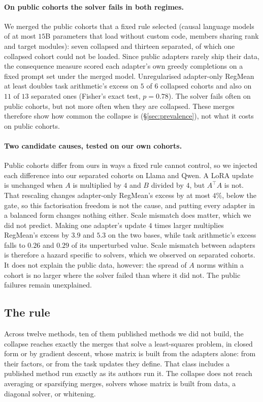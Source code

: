\paragraph{On public cohorts the solver fails in both regimes.} We merged the
public cohorts that a fixed rule selected (causal language models of at most
$15$B parameters that load without custom code, members sharing rank and
target modules): seven collapsed and thirteen separated, of which one
collapsed cohort could not be loaded. Since public adapters rarely ship their
data, the consequence measure scored each adapter's own greedy completions on
a fixed prompt set under the merged model. Unregularised adapter-only RegMean
at least doubles task arithmetic's excess on $5$ of $6$ collapsed cohorts and
also on $11$ of $13$ separated ones (Fisher's exact test, $p = 0.78$). The
solver fails often on public cohorts, but not more often when they are
collapsed. These merges therefore show how common the collapse is
(\S\ref{sec:prevalence}), not what it costs on public cohorts.

\paragraph{Two candidate causes, tested on our own cohorts.} Public cohorts
differ from ours in ways a fixed rule cannot control, so we injected each
difference into our separated cohorts on Llama and Qwen. A LoRA update is
unchanged when $A$ is multiplied by $4$ and $B$ divided by $4$, but $A^\top A$
is not. That rescaling changes adapter-only RegMean's excess by at most $4\%$,
below the gate, so this factorisation freedom is not the cause, and putting
every adapter in a balanced form changes nothing either. Scale mismatch does
matter, which we did not predict. Making one adapter's update $4$ times larger
multiplies RegMean's excess by $3.9$ and $5.3$ on the two bases, while task
arithmetic's excess falls to $0.26$ and $0.29$ of its unperturbed value. Scale
mismatch between adapters is therefore a hazard specific to solvers, which we
observed on separated cohorts. It does not explain the public data, however: the spread of $A$ norms within a cohort is no larger where the
solver failed than where it did not. The public failures remain unexplained.

\subsection{The rule}\label{subsec:rule}

Across twelve methods, ten of them published methods we did not build, the
collapse reaches exactly the merges that solve a least-squares problem, in
closed form or by gradient descent, whose matrix is built from the adapters
alone: from their factors, or from the task updates they define. That class
includes a published method run exactly as its authors run it. The collapse
does not reach averaging or sparsifying merges, solvers whose matrix is built
from data, a diagonal solver, or whitening.
